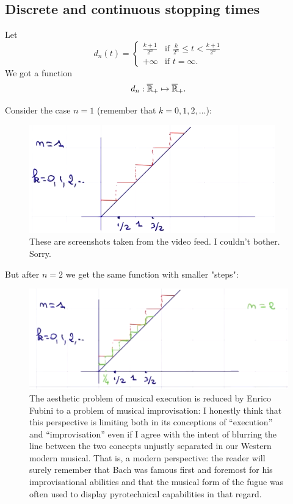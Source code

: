 \documentclass{report}
\begin{document}
\subsection{Discrete and continuous stopping times}
\begin{definition}
	Let
	\begin{equation*}
		d_n(t)=\begin{cases}
			\frac{k+1}{2^{n}}&\text{if }\frac{k}{2^{n}}\leq t <\frac{k+1}{2^{n}}\\
			+\infty &\text{if }t=\infty.
		\end{cases}
	\end{equation*}
	We got a function
	\[d_n:\overline{\mathbb{R}}_+\mapsto\overline{\mathbb{R}}_+.\]
\end{definition}
Consider the case $n=1$ (remember that $k=0,1,2,\ldots$):
\begin{figure}[H]
	\centering
	\includegraphics[width=0.6\linewidth]{screenshot011}
	\caption{These are screenshots taken from the video feed. I couldn't bother. Sorry.}
	\label{fig:screenshot011}
\end{figure}
But after $n=2$ we get the same function with smaller "steps":
\begin{figure}[H]
	\centering
	\includegraphics[width=0.6\linewidth]{screenshot012}
	\caption[The problem of improvisation]{The aesthetic problem of musical execution is reduced by Enrico Fubini to a problem of musical improvisation: I honestly think that this perspective is limiting both in its conceptions of ``execution'' and ``improvisation'' even if I agree with the intent of blurring the line between the two concepts unjustly separated in our Western modern musical. That is, a modern perspective: the reader will surely remember that Bach was famous first and foremost for his improvisational abilities and that the musical form of the fugue was often used to display pyrotechnical capabilities in that regard.}
	\label{fig:screenshot012}
\end{figure}
\end{document}
